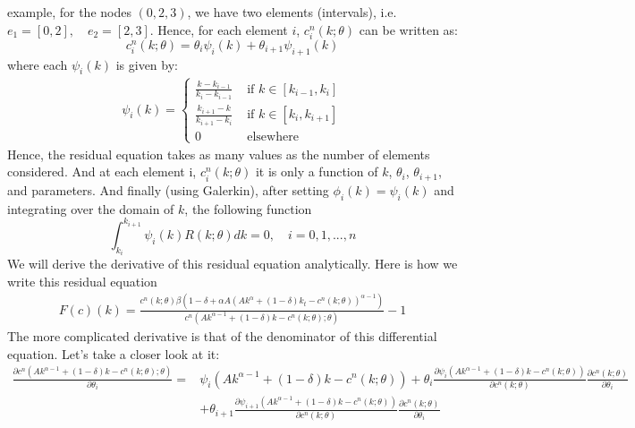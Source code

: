 \documentclass{article} %
\begin{document}
example, for the nodes $(0,2,3)$, we have two elements (intervals),
i.e. $e_1 = [0,2], \quad e_2 = [2,3]$. Hence, for each element $i$,
$c_i^n(k;\theta)$ can be written as:
\begin{equation}
  c_i^n(k;\theta) = \theta_i \psi_i(k) + \theta_{i+1} \psi_{i+1}(k)
\end{equation}
where each $\psi_i(k)$ is given by:
\begin{align*} \psi_i(k) =
  \left \{
  \begin{array}{ll}
  \frac{k - k_{i-1}}{k_i - k_{i-1}} & \text{ if } k \in [k_{i-1},k_i] \\
    \frac{k_{i+1} - k}{k_{i+1} - k_{i}} & \text{ if } k \in [k_{i},k_{i+1}] \\
    0 & \text{ elsewhere}
  \end{array} \right. 
\end{align*}
Hence, the residual equation takes as many values as the number of
elements considered. And at each element i, $c^n_i(k;\theta)$ it is only
a function of $k$, $\theta_i$, $\theta_{i+1}$, and parameters. And finally (using
Galerkin), after setting $\phi_i(k) = \psi_i(k)$ and integrating over the domain of $k$, the following function
\begin{equation*}
  \int_{k_{i}}^{k_{i+1}} \psi_i(k) R(k;\theta) dk = 0, \quad i=0,1,...,n 
\end{equation*} 
We will derive the derivative of this residual equation analytically. Here is how we write this residual equation
\begin{align*}
  F(c)(k) = \frac{c^n(k;\theta) \beta \left(1-\delta + \alpha A  \left(A  k^{\alpha} + (1-\delta)k_t - c^n(k;\theta)\right)^{\alpha - 1}\right) }{c^n(A  k^{\alpha - 1} + (1-\delta)k - c^n(k;\theta);\theta)}-1
\end{align*}
The more complicated derivative is that of the denominator of this differential equation. Let's take a closer look at it:
\begin{align*}
  \frac{\partial c^n(A  k^{\alpha - 1} + (1-\delta)k - c^n(k;\theta);\theta)}{\partial \theta_i}  = & \psi_i(A  k^{\alpha - 1} + (1-\delta)k - c^n(k;\theta)) + \theta_i \frac{\partial \psi_i(A  k^{\alpha - 1} + (1-\delta)k - c^n(k;\theta))}{\partial c^n(k;\theta)} \frac{\partial c^n(k;\theta)}{\partial \theta_i} \\
  & + \theta_{i+1} \frac{\partial \psi_{i+1}(A  k^{\alpha - 1} + (1-\delta)k - c^n(k;\theta))}{\partial c^n(k;\theta)} \frac{\partial c^n(k;\theta)}{\partial \theta_i}
\end{align*}
\end{document}
